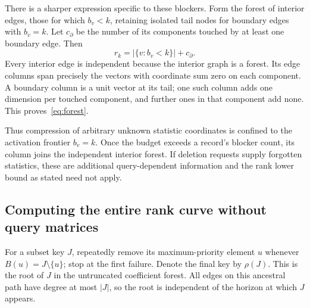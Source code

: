 \documentclass[11pt,a4paper]{article}
\theoremstyle{definition}\newtheorem{definition}[theorem]{Definition}
\newcommand{\minus}{\setminus}
\begin{document}
There is a sharper expression specific to these blockers. Form the forest of interior edges, those for which $b_v<k$, retaining isolated tail nodes for boundary edges with $b_v=k$. Let $c_{\partial}$ be the number of its components touched by at least one boundary edge. Then
\begin{equation}\label{eq:forest}
 r_k=|\{v:b_v<k\}|+c_{\partial}.
\end{equation}
Every interior edge is independent because the interior graph is a forest. Its edge columns span precisely the vectors with coordinate sum zero on each component. A boundary column is a unit vector at its tail; one such column adds one dimension per touched component, and further ones in that component add none. This proves~\eqref{eq:forest}.

Thus compression of arbitrary unknown statistic coordinates is confined to the activation frontier $b_v=k$. Once the budget exceeds a record's blocker count, its column joins the independent interior forest. If deletion requests supply forgotten statistics, these are additional query-dependent information and the rank lower bound as stated need not apply.

\subsection{Computing the entire rank curve without query matrices}
For a subset key $J$, repeatedly remove its maximum-priority element $u$ whenever $B(u)=J\minus\{u\}$; stop at the first failure. Denote the final key by $\rho(J)$. This is the root of $J$ in the untruncated coefficient forest. All edges on this ancestral path have degree at most $|J|$, so the root is independent of the horizon at which $J$ appears.
\end{document}
